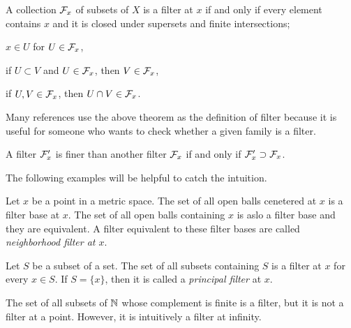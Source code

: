 \begin{thm}
A collection $\mathcal{F}_x$ of subsets of $X$ is a filter at $x$ if and only if every element contains $x$ and it is closed under supersets and finite intersections;
\begin{cond}
\item $x\in U$ for $U\in\mathcal{F}_x$,
\item if $U\subset V$ and $U\in\mathcal{F}_x$, then $V\in\mathcal{F}_x$,
\item if $U,V\in\mathcal{F}_x$, then $U\cap V\in\mathcal{F}_x$.
\end{cond}
\end{thm}
\begin{pf}
\end{pf}

Many references use the above theorem as the definition of filter because it is useful for someone who wants to check whether a given family is a filter.

\begin{thm}
A filter $\mathcal{F}'_x$ is finer than another filter $\mathcal{F}_x$ if and only if $\mathcal{F}'_x\supset\mathcal{F}_x$.
\end{thm}
\begin{pf}
\end{pf}

The following examples will be helpful to catch the intuition.

\begin{ex}\label{ex:neighborhood filter}
Let $x$ be a point in a metric space.
The set of all open balls cenetered at $x$ is a filter base at $x$.
The set of all open balls containing $x$ is aslo a filter base and they are equivalent.
A filter equivalent to these filter bases are called \emph{neighborhood filter at $x$}.
\end{ex}
\begin{ex}
Let $S$ be a subset of a set.
The set of all subsets containing $S$ is a filter at $x$ for every $x\in S$.
If $S=\{x\}$, then it is called a \emph{principal filter} at $x$.
\end{ex}
\begin{ex}
The set of all subsets of $\mathbb{N}$ whose complement is finite is a filter, but it is not a filter at a point.
However, it is intuitively a filter at infinity.
\end{ex}













